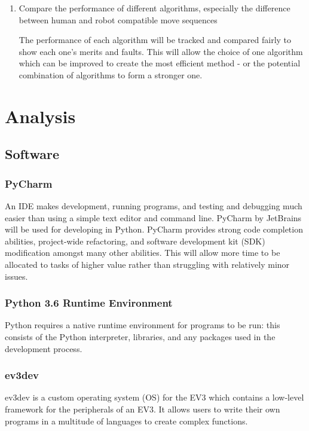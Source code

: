 \documentclass{report}
\begin{document}
\begin{enumerate}
    	\item Compare the performance of different algorithms, especially the difference between human and robot compatible move sequences \par The performance of each algorithm will be tracked and compared fairly to show each one's merits and faults. This will allow the choice of one algorithm which can be improved to create the most efficient method - or the potential combination of algorithms to form a stronger one.
    \end{enumerate}
    
    \section{Analysis}
    \subsection{Software}
    
    \subsubsection{PyCharm}
    An IDE makes development, running programs, and testing and debugging much easier than using a simple text editor and command line. PyCharm by JetBrains \cite{JetBrains} will be used for developing in Python. PyCharm provides strong code completion abilities, project-wide refactoring, and software development kit (SDK) modification amongst many other abilities. This will allow more time to be allocated to tasks of higher value rather than struggling with relatively minor issues.
    
	\subsubsection{Python 3.6 Runtime Environment}
    Python requires a native runtime environment for programs to be run: this consists of the Python interpreter, libraries, and any packages used in the development process.
    
    \subsubsection{ev3dev}
    ev3dev \cite{Ev3dev.org} is a custom operating system (OS) for the EV3 which contains a low-level framework for the peripherals of an EV3. It allows users to write their own programs in a multitude of languages to create complex functions.
    
\end{document}
